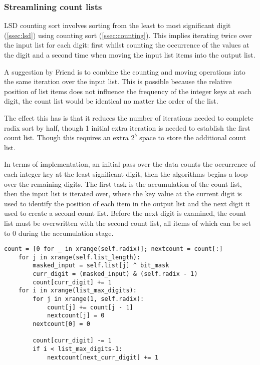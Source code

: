 \documentclass[12pt]{article}
\begin{document}
\subsubsection{Streamlining count lists}
\label{sssec:countlist}
LSD counting sort involves sorting from the least to most significant digit (\ref{ssec:lsd}) using counting sort (\ref{ssec:counting}). This implies iterating twice over the input list for each digit: first whilst counting the occurrence of the values at the digit and a second time when moving the input list items into the output list.
\par
A suggestion by Friend \cite{Friend} is to combine the counting and moving operations into the same iteration over the input list. This is possible because the relative position of list items does not influence the frequency of the integer keys at each digit, the count list would be identical no matter the order of the list.
\par
The effect this has is that it reduces the number of iterations needed to complete radix sort by half, though 1 initial extra iteration is needed to establish the first count list. Though this requires an extra $2^b$ space to store the additional count list.
\par 
In terms of implementation, an initial pass over the data counts the occurrence of each integer key at the least significant digit, then the algorithms begins a loop over the remaining digits. The first task is the accumulation of the count list, then the input list is iterated over, where the key value at the current digit is used to identify the position of each item in the output list and the next digit it used to create a second count list. Before the next digit is examined, the count list must be overwritten with the second count list, all items of which can be set to 0 during the accumulation stage.
\begin{table}[H]
	\centering
\begin{lstlisting}[caption={Count list accumulation using two count lists \\ This code is simplified, see \ref{sssec:lsdcounting}},captionpos=b]
	count = [0 for _ in xrange(self.radix)]; nextcount = count[:]
	for j in xrange(self.list_length):
		masked_input = self.list[j] ^ bit_mask
		curr_digit = (masked_input) & (self.radix - 1)
		count[curr_digit] += 1
	for i in xrange(list_max_digits):
		for j in xrange(1, self.radix):                    
			count[j] += count[j - 1]
			nextcount[j] = 0
		nextcount[0] = 0

		count[curr_digit] -= 1
		if i < list_max_digits-1:
			nextcount[next_curr_digit] += 1
		\end{lstlisting}
\end{table}
\end{document}
